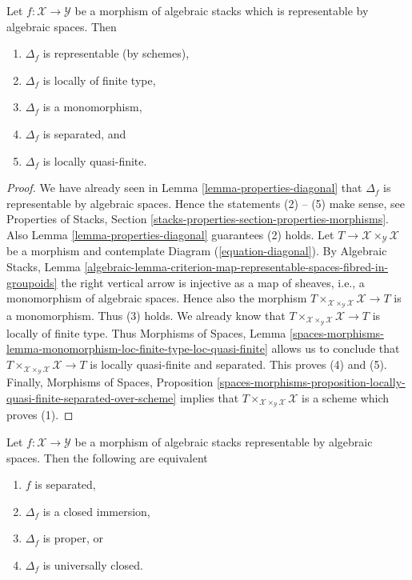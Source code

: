 \begin{lemma}
\label{lemma-properties-diagonal-representable}
Let $f : \mathcal{X} \to \mathcal{Y}$ be a morphism of algebraic stacks
which is representable by algebraic spaces. Then
\begin{enumerate}
\item $\Delta_f$ is representable
(by schemes),
\item $\Delta_f$ is locally of finite type,
\item $\Delta_f$ is a monomorphism,
\item $\Delta_f$ is separated, and
\item $\Delta_f$ is locally quasi-finite.
\end{enumerate}
\end{lemma}

\begin{proof}
We have already seen in
Lemma \ref{lemma-properties-diagonal}
that $\Delta_f$ is representable by algebraic
spaces. Hence the statements (2) -- (5) make sense, see
Properties of Stacks,
Section \ref{stacks-properties-section-properties-morphisms}.
Also
Lemma \ref{lemma-properties-diagonal}
guarantees (2) holds.
Let $T \to \mathcal{X} \times_\mathcal{Y} \mathcal{X}$ be a morphism
and contemplate Diagram (\ref{equation-diagonal}). By
Algebraic Stacks, Lemma
\ref{algebraic-lemma-criterion-map-representable-spaces-fibred-in-groupoids}
the right vertical arrow is injective as a map of sheaves, i.e., a
monomorphism of algebraic spaces. Hence also the morphism
$T \times_{\mathcal{X} \times_\mathcal{Y} \mathcal{X}} \mathcal{X} \to T$
is a monomorphism. Thus (3) holds. We already know that
$T \times_{\mathcal{X} \times_\mathcal{Y} \mathcal{X}} \mathcal{X} \to T$
is locally of finite type. Thus
Morphisms of Spaces, Lemma
\ref{spaces-morphisms-lemma-monomorphism-loc-finite-type-loc-quasi-finite}
allows us to conclude that
$T \times_{\mathcal{X} \times_\mathcal{Y} \mathcal{X}} \mathcal{X} \to T$
is locally quasi-finite and separated. This proves (4) and (5).
Finally,
Morphisms of Spaces, Proposition
\ref{spaces-morphisms-proposition-locally-quasi-finite-separated-over-scheme}
implies that
$T \times_{\mathcal{X} \times_\mathcal{Y} \mathcal{X}} \mathcal{X}$
is a scheme which proves (1).
\end{proof}

\begin{lemma}
\label{lemma-representable-separated-diagonal-closed}
Let $f : \mathcal{X} \to \mathcal{Y}$ be a morphism of algebraic stacks
representable by algebraic spaces. Then the following are equivalent
\begin{enumerate}
\item $f$ is separated,
\item $\Delta_f$ is a closed immersion,
\item $\Delta_f$ is proper, or
\item $\Delta_f$ is universally closed.
\end{enumerate}
\end{lemma}

